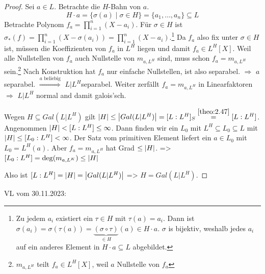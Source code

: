 \documentclass[../main.tex]{subfiles}
\begin{document}
\begin{proof}
    Sei $a\in L$. Betrachte die $H$-Bahn von $a$.
    $$H\cdot a = \{\sigma(a)\mid \sigma\in H\} = \{a_1,\dots, a_n\} \subseteq L$$
    Betrachte Polynom $f_a = \prod_{i=1}^n (X-a_i)$.
    Für $\sigma\in H$ ist $\sigma_*(f) = \prod_{i=1}^n\left(X-\sigma(a_i)\right) = \prod_{i=1}^n(X-a_i)$.\footnote{Zu jedem $a_i$ existiert ein $\tau\in H$ mit $\tau(a) = a_i$. Dann ist $\sigma(a_i) = \sigma(\tau(a)) = \underbrace{(\sigma\circ \tau)}_{\in H}(a)\in H\cdot a$.
    $\sigma$ is bijektiv, weshalb jedes $a_i$ auf ein anderes Element in $H\cdot a\subseteq L$ abgebildet.}
    Da $f_a$ also fix unter $\sigma\in H$ ist, müssen die Koeffizienten von $f_a$ in $L^H$ liegen und damit $f_a\in L^H[X]$.
    Weil alle Nullstellen von $f_a$ auch Nullstelle von $m_{a,L^H}$ sind, muss schon $f_a=m_{a,L^H}$ sein.\footnote{$m_{a,L^H}$ teilt $f_a\in L^H[X]$, weil $a$ Nullstelle von $f_a$}
    Nach Konstruktion hat $f_a$ nur einfache Nullstellen, ist also separabel. $\Rightarrow$ $a$ separabel. $\overset{a\text{ beliebig}}{\Rightarrow}$ $L|L^H$separabel.
    Weiter zerfällt $f_a=m_{a,L^H}$ in Linearfaktoren $\Rightarrow$ $L|L^H$ normal and damit galois'sch.

    Wegen $H\subseteq Gal(L|L^H)$ gilt $\card{H}\leq \card{Gal(L|L^H)} = [L:L^H]_S \overset{\cref{theo:2.47}}{=} [L:L^H]$.
    Angenommen $\left\vert H \right\vert < [L:L^H]\leq \infty$. 
    Dann finden wir ein $L_0$ mit $L^H\subseteq L_0 \subseteq L$ mit $\left\vert H \right\vert \leq [L_0:L^H] <\infty$.
    Der Satz vom primitiven Element liefert ein $a\in L_0$ mit $L_0 = L^H(a)$.
    Aber $f_a=m_{a,L^H}$ hat Grad $\leq \left\vert H \right\vert$.
    => $[L_0:L^H] = \deg(m_{a,L^K})\leq \left\vert H \right\vert$ \Lightning

    Also ist $[L:L^H] = \left\vert H \right\vert = \left\vert Gal(L|L^H) \right\vert$
    => $H=Gal(L|L^H)$.
\end{proof}
\begin{flushright}
VL vom 30.11.2023:
\end{flushright}
\end{document}
